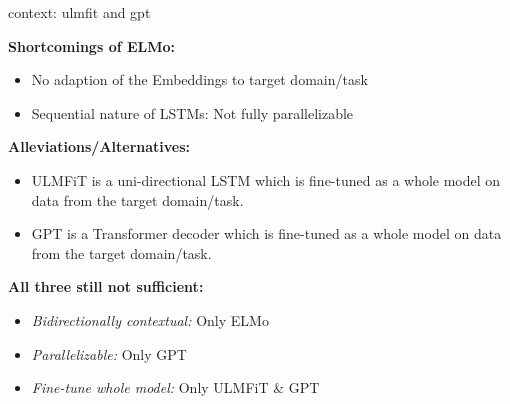 
\begin{frame}{context: ulmfit and gpt}

\vfill

	\textbf{Shortcomings of ELMo:}

	\begin{itemize}
		\item No adaption of the Embeddings to target domain/task
		\item Sequential nature of LSTMs: Not fully parallelizable 
	\end{itemize}
	
	\textbf{Alleviations/Alternatives:}

	\begin{itemize}
		\item ULMFiT  is a uni-directional LSTM which is fine-tuned as a whole model on data from the target domain/task.
		\item GPT  is a Transformer decoder which is fine-tuned as a whole model on data from the target domain/task.
	\end{itemize}
	
	\textbf{All three still not sufficient:}

	\begin{itemize}
		\item \textit{Bidirectionally contextual:} Only ELMo 
		\item \textit{Parallelizable:} Only GPT
		\item \textit{Fine-tune whole model:} Only ULMFiT \& GPT
	\end{itemize}
	
\vfill


\end{frame}


